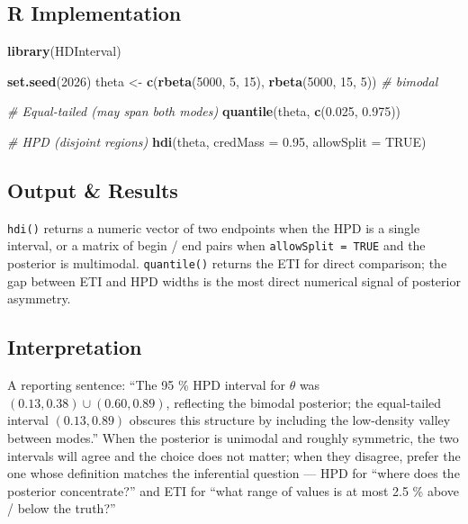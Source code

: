 \documentclass[
]{article}
\newenvironment{Shaded}{\begin{snugshade}}{\end{snugshade}}
\newcommand{\AttributeTok}[1]{\textcolor[rgb]{0.13,0.29,0.53}{#1}}
\newcommand{\CommentTok}[1]{\textcolor[rgb]{0.56,0.35,0.01}{\textit{#1}}}
\newcommand{\ConstantTok}[1]{\textcolor[rgb]{0.56,0.35,0.01}{#1}}
\newcommand{\DecValTok}[1]{\textcolor[rgb]{0.00,0.00,0.81}{#1}}
\newcommand{\FloatTok}[1]{\textcolor[rgb]{0.00,0.00,0.81}{#1}}
\newcommand{\FunctionTok}[1]{\textcolor[rgb]{0.13,0.29,0.53}{\textbf{#1}}}
\newcommand{\NormalTok}[1]{#1}
\newcommand{\OtherTok}[1]{\textcolor[rgb]{0.56,0.35,0.01}{#1}}
\begin{document}
\subsection{R Implementation}\label{r-implementation}

\begin{Shaded}
\begin{Highlighting}[]
\FunctionTok{library}\NormalTok{(HDInterval)}

\FunctionTok{set.seed}\NormalTok{(}\DecValTok{2026}\NormalTok{)}
\NormalTok{theta }\OtherTok{\textless{}{-}} \FunctionTok{c}\NormalTok{(}\FunctionTok{rbeta}\NormalTok{(}\DecValTok{5000}\NormalTok{, }\DecValTok{5}\NormalTok{, }\DecValTok{15}\NormalTok{), }\FunctionTok{rbeta}\NormalTok{(}\DecValTok{5000}\NormalTok{, }\DecValTok{15}\NormalTok{, }\DecValTok{5}\NormalTok{))  }\CommentTok{\# bimodal}

\CommentTok{\# Equal{-}tailed (may span both modes)}
\FunctionTok{quantile}\NormalTok{(theta, }\FunctionTok{c}\NormalTok{(}\FloatTok{0.025}\NormalTok{, }\FloatTok{0.975}\NormalTok{))}

\CommentTok{\# HPD (disjoint regions)}
\FunctionTok{hdi}\NormalTok{(theta, }\AttributeTok{credMass =} \FloatTok{0.95}\NormalTok{, }\AttributeTok{allowSplit =} \ConstantTok{TRUE}\NormalTok{)}
\end{Highlighting}
\end{Shaded}

\subsection{Output \& Results}\label{output-results}

\texttt{hdi()} returns a numeric vector of two endpoints when the HPD is
a single interval, or a matrix of begin / end pairs when
\texttt{allowSplit\ =\ TRUE} and the posterior is multimodal.
\texttt{quantile()} returns the ETI for direct comparison; the gap
between ETI and HPD widths is the most direct numerical signal of
posterior asymmetry.

\subsection{Interpretation}\label{interpretation}

A reporting sentence: ``The 95 \% HPD interval for \(\theta\) was
\((0.13, 0.38) \cup (0.60, 0.89)\), reflecting the bimodal posterior;
the equal-tailed interval \((0.13, 0.89)\) obscures this structure by
including the low-density valley between modes.'' When the posterior is
unimodal and roughly symmetric, the two intervals will agree and the
choice does not matter; when they disagree, prefer the one whose
definition matches the inferential question --- HPD for ``where does the
posterior concentrate?'' and ETI for ``what range of values is at most
2.5 \% above / below the truth?''
\end{document}
